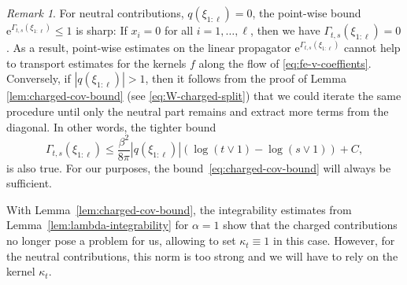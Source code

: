 \documentclass[11pt, a4paper]{scrartcl}
\numberwithin{equation}{section}
\theoremstyle{plain}
\theoremstyle{remark}
\newtheorem{remark}[foo]{Remark}
\newcommand{\mathe}{\mathrm{e}}
\begin{document}
\begin{remark}
	\label{rem:charge}For neutral contributions, $q (\xi_{1 : \ell}) = 0$, the
	point-wise bound $\mathe^{\Gamma_{t, s} (\xi_{1 : \ell})} \leqslant 1$ is sharp:
	If $x_i = 0$ for all $i = 1, \ldots, \ell$, then we have $\Gamma_{t, s} (\xi_{1 :
			\ell}) = 0$. As a result, point-wise estimates on the linear propagator
	$\mathe^{\Gamma_{t, s} (\xi_{1 : \ell})}$ cannot help to transport estimates for
	the kernels $f$ along the flow of \eqref{eq:fe-v-coeffients}. Conversely, if
	$| q (\xi_{1 : \ell}) | > 1$, then it follows from the proof of Lemma
	\ref{lem:charged-cov-bound} (see \eqref{eq:W-charged-split}) that we could
	iterate the same procedure until only the neutral part remains and extract
	more terms from the diagonal. In other words, the tighter bound
	\[ \Gamma_{t, s} (\xi_{1 : \ell}) \leqslant \frac{\beta^2}{8 \pi} | q (\xi_{1 :
			\ell}) | (\log (t \vee 1) - \log (s \vee 1)) + C, \]
	is also true. For our purposes, the bound~\eqref{eq:charged-cov-bound} will
	always be sufficient.
\end{remark}

With Lemma~\ref{lem:charged-cov-bound}, the integrability estimates from
Lemma~\ref{lem:lambda-integrability} for $\alpha = 1$ show that the charged
contributions no longer pose a problem for us, allowing to set $\kappa_t \equiv 1$
in this case. However, for the neutral contributions, this norm is too strong
and we will have to rely on the kernel $\kappa_t$.
\end{document}
